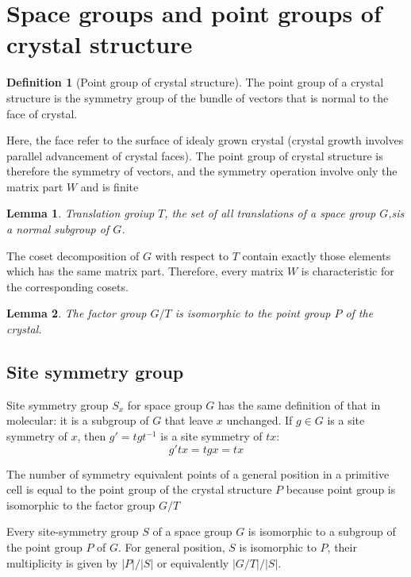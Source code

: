 \documentclass{amsart}
\newtheorem*{lemma}{Lemma}
\theoremstyle{remark}
\theoremstyle{remark}
\theoremstyle{definition}
\newtheorem*{definition}{Definition}
\begin{document}
\vspace{10pt}
\section*{Space groups and point groups of crystal structure}

\begin{definition}
    [Point group of crystal structure]
    The point group of a crystal structure is the symmetry group of the bundle of vectors that is normal to the face of crystal.
\end{definition}
Here, the face refer to the surface of idealy grown crystal (crystal growth involves parallel advancement of crystal faces). 
The point group of crystal structure is therefore the symmetry of vectors, and the symmetry operation involve only 
the matrix part $W$ and is finite

\begin{lemma}
    Translation groiup $T$, the set of all translations of a space group $G$,sis a normal subgroup of $G$.
\end{lemma}
The coset decomposition of $G$ with respect to $T$ contain exactly those elements which has the same matrix part. 
Therefore, every matrix $W$ is characteristic for the corresponding cosets. 

\begin{lemma}
    The factor group $G/T$ is isomorphic to the point group $P$ of the crystal.
\end{lemma}

\vspace{10pt}
\subsection*{Site symmetry group}
Site symmetry group $S_x$ for space group $G$ has the same definition of that in molecular: it is 
a subgroup of $G$ that leave $x$ unchanged. 
If $g\in G$ is a site symmetry of $x$, then $g' = tgt^{-1}$ is a site symmetry of $tx$:
\begin{equation*}
    g'tx = tgx = tx
\end{equation*}

The number of symmetry equivalent points of a general position in a primitive cell is equal to the point 
group of the crystal structure $P$ because point group is isomorphic to the factor group $G/T$

Every site-symmetry group $S$ of a space group $G$ is isomorphic to a subgroup of the point group $P$ of $G$. 
For general position, $S$ is isomorphic to $P$, their multiplicity is given by $|P|/|S|$ or equivalently $|G/T|/|S|$.
\end{document}
